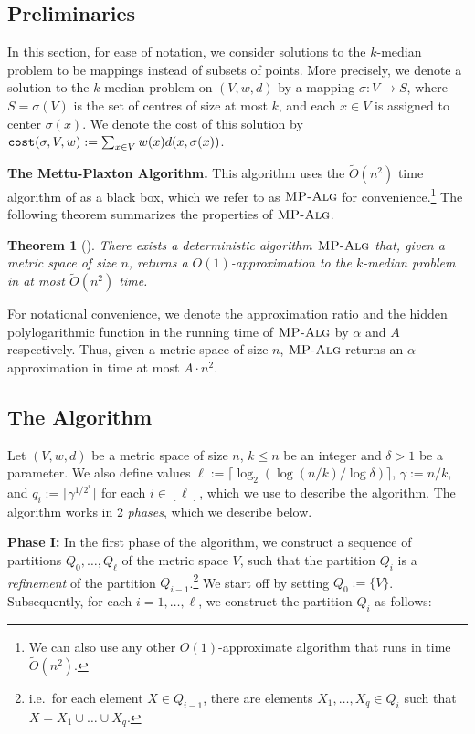 \documentclass[11pt]{article}
\newcommand{\1}{\mathmybb{1}}
\newtheorem{theorem}{Theorem}[section]
\newcommand{\cost}{\textnormal{\texttt{cost}}}
\newcommand{\MPAlg}{\textnormal{\textsc{MP-Alg}}}
\begin{document}
\subsection{Preliminaries}

In this section, for ease of notation, we consider solutions to the $k$-median problem to be mappings instead of subsets of points.
More precisely, we denote a solution to the $k$-median problem on $(V,w,d)$ by a mapping $\sigma : V \longrightarrow S$, where $S = \sigma(V)$ is the set of centres of size at most $k$, and each $x \in V$ is assigned to center $\sigma(x)$.
We denote the cost of this solution by
$\cost(\sigma,V,w) := \sum_{x \in V} w(x)d(x, \sigma(x))$.



\medskip
\noindent\textbf{The Mettu-Plaxton Algorithm.}
This algorithm uses the $\tilde O(n^2)$ time algorithm of \cite{MettuP00} as a black box, which we refer to as $\MPAlg$ for convenience.\footnote{We can also use any other $O(1)$-approximate algorithm that runs in time $\tilde O(n^2)$.} The following theorem summarizes the properties of $\MPAlg$.

\begin{theorem}[\cite{MettuP00}]\label{thm:MP alg} There exists a deterministic algorithm $\MPAlg$ that, given a metric space of size $n$, returns a $O(1)$-approximation to the $k$-median problem in at most $\tilde O(n^2)$ time.
\end{theorem}

For notational convenience, we denote the approximation ratio and the hidden polylogarithmic function in the running time of $\MPAlg$ by $\alpha$ and $A$ respectively. Thus, given a metric space of size $n$, $\MPAlg$ returns an $\alpha$-approximation in time at most $A \cdot n^2$.

\subsection{The Algorithm}

Let $(V, w, d)$ be a metric space of size $n$, $k \leq n$ be an integer and $\delta > 1$ be a parameter.
We also define values $\ell := \lceil \log_2(\log(n/k)/\log \delta) \rceil$, $\gamma := n/k$, and $q_i := \lceil \gamma^{1/2^{i}} \rceil$ for each $i \in [\ell]$, which we use to describe the algorithm.
The algorithm works in 2 \emph{phases}, which we describe below.

\medskip
\noindent
\textbf{Phase I:} In the first phase of the algorithm, we construct a sequence of partitions $Q_0,\dots, Q_\ell$ of the metric space $V$, such that the partition $Q_i$ is a \emph{refinement} of the partition $Q_{i-1}$.\footnote{i.e.~for each element $X \in Q_{i-1}$, there are elements $X_1,\dots, X_q \in Q_i$ such that $X=X_1\cup \dots \cup X_q$.} We start off by setting $Q_0 := \{V\}$. Subsequently, for each $i = 1,\dots,\ell$, we construct the partition $Q_i$ as follows:
\end{document}
